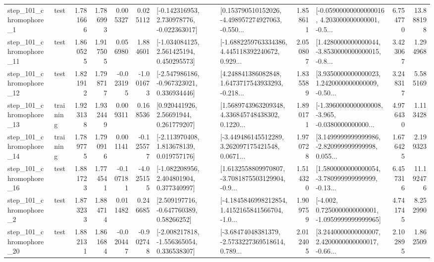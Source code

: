 \begin{tabular}{llrrrrllrlrr}
   step\_101\_chromophore\_1 &      test &      1.781666 &    1.786993 &      0.005327 &  0.025112 &   [-0.142316953, 2.730978776, -0.022363017] &  [0.153790510152026, -4.498957274927063, -0.550... &       1.858611 &  [-0.05900000000000016, 4.203000000000001, -0.5... &            6.754770 &         13.888198 \\
  step\_101\_chromophore\_11 &      test &      1.860525 &    1.917505 &      0.056980 &  1.884601 &    [-1.034084125, 2.561425194, 0.450295573] &  [-1.6882259763334386, 4.445118392240672, 0.929... &       2.050807 &  [1.4280000000000044, -3.8530000000000015, -0.8... &            3.423067 &          1.294968 \\
  step\_101\_chromophore\_12 &      test &      1.821912 &    1.798717 &     -0.023195 & -1.001673 &   [-2.547986186, -0.967323021, 0.336934446] &  [4.248841386082848, 1.6473717543933293, -0.218... &       1.835589 &  [3.9350000000000023, 1.2420000000000009, -0.50... &            3.248317 &          5.585169 \\
  step\_101\_chromophore\_13 &  training &      1.923138 &    1.932449 &      0.009311 &  0.168536 &      [0.920441926, 2.56691944, 0.261779207] &  [1.5689743963209348, 4.336845748438302, 0.1220... &       1.890171 &  [-1.3960000000000008, -3.965, -0.0380000000000... &            4.976430 &          1.113428 \\
  step\_101\_chromophore\_14 &  training &      1.789775 &    1.790916 &      0.001141 & -0.125577 &    [-2.113970408, 1.813678139, 0.019757176] &  [-3.449486145512289, 3.262097175421548, 0.0671... &       1.970728 &  [3.1499999999999986, -2.820999999999998, 0.055... &            1.676425 &          2.199323 \\
  step\_101\_chromophore\_16 &      test &      1.881723 &    1.774541 &     -0.107181 & -4.025155 &    [-1.082208956, 2.404801904, 0.377340997] &  [1.6132558809970807, -3.7081875503129904, -0.9... &       1.514320 &  [1.5800000000000054, -3.780999999999999, -0.13... &            6.457316 &         11.192476 \\
   step\_101\_chromophore\_2 &      test &      1.873233 &    1.884714 &      0.011482 &  0.246685 &     [2.509197716, -0.647760389, 0.58266252] &  [-4.1845846998212854, 1.4152165841566704, -1.0... &       1.909759 &  [-4.002, 0.7250000000000001, -1.0959999999999965] &            4.741745 &          8.252990 \\
  step\_101\_chromophore\_20 &      test &      1.882131 &    1.861684 &     -0.020447 & -0.902748 &   [-2.008217818, -1.556365054, 0.336538307] &  [-3.68474048381379, -2.5733227369518614, 0.789... &       2.012405 &  [3.2440000000000007, 2.4200000000000017, -0.66... &            2.102895 &          1.862509 \\

\end{tabular}
